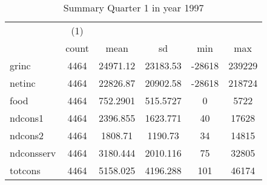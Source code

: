 \begin{table}[htbp]\centering
\def\sym#1{\ifmmode^{#1}\else\(^{#1}\)\fi}
\caption{Summary Quarter 1 in year 1997 \label{sum\_Q1\_y1997}}
\begin{tabular}{l*{1}{ccccc}}
\hline\hline
            &\multicolumn{1}{c}{(1)}&            &            &            &            \\
            &       count&        mean&          sd&         min&         max\\
\hline
grinc       &        4464&    24971.12&    23183.53&      -28618&      239229\\
netinc      &        4464&    22826.87&    20902.58&      -28618&      218724\\
food        &        4464&    752.2901&    515.5727&           0&        5722\\
ndcons1     &        4464&    2396.855&    1623.771&          40&       17628\\
ndcons2     &        4464&     1808.71&     1190.73&          34&       14815\\
ndconsserv  &        4464&    3180.444&    2010.116&          75&       32805\\
totcons     &        4464&    5158.025&    4196.288&         101&       46174\\
\hline\hline
\end{tabular}
\end{table}
